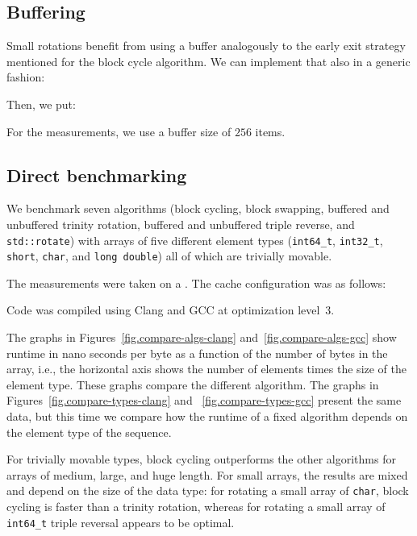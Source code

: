 \documentclass[12pt,a4paper]{article}
\begin{document}
  
  
  \subsection*{Buffering}
  Small rotations benefit from using a buffer analogously to
  the early exit strategy mentioned for the block cycle algorithm.
  We can implement that also in a generic fashion:

  

  Then, we put:
  
  

  For the measurements, we use a buffer size of $256$ items.

  
  \subsection*{Direct benchmarking}
  We benchmark seven algorithms (block cycling, block
  swapping, buffered and unbuffered trinity rotation, buffered and
  unbuffered triple reverse, and \verb+std::rotate+) with arrays of
  five different element types (\verb+int64_t+, \verb+int32_t+,
  \verb+short+, \verb+char+, and \verb+long double+) all of which are
  trivially movable.

  The measurements were taken on a \unskip.
  The cache configuration was as follows:
  \begin{center}
    {\fontsize{9}{12}\selectfont}
  \end{center}
  Code was compiled using Clang and {\small GCC} at optimization level~3.
 
  The graphs in Figures~\ref{fig.compare-algs-clang}
  and~\ref{fig.compare-algs-gcc} show runtime in
  nano seconds per byte as a function of the number of bytes in the
  array, i.e., the horizontal axis shows the number of elements times
  the size of the element type. These graphs compare the different
  algorithm.  The graphs in Figures~\ref{fig.compare-types-clang}
  and ~\ref{fig.compare-types-gcc}
  present the same data, but this time we compare how the runtime of a
  fixed algorithm depends on the element type of the sequence.

  For trivially movable types, block cycling outperforms the other
  algorithms for arrays of medium, large, and huge length. For small
  arrays, the results are mixed and depend on the size of the data
  type: for rotating a small array of \verb+char+, block cycling is
  faster than a trinity rotation, whereas for rotating a small array of
  \verb+int64_t+ triple reversal appears to be optimal.
  
\end{document}
